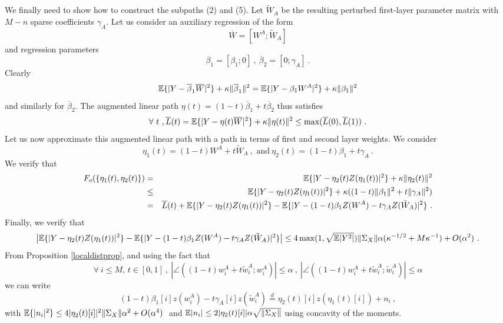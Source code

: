 We finally need to show how to construct the subpaths (2) and (5).
Let $\tilde{W}_A$ be the resulting perturbed first-layer parameter matrix 
with $M-n$ sparse coefficients $\gamma_A$.
Let us consider an auxiliary regression of the form 
$$\overline{W} = [ W^A ; \tilde{W}_A]$$
and regression parameters 
$$\overline{\beta}_1 = [ \beta_1; 0]~,~\overline{\beta}_2 = [0; \gamma_A]~.$$
Clearly 
$${\mathbb{E}}\{ | Y - \overline{\beta}_1 \overline{W} |^2 \} + \kappa \| \overline{\beta}_1 \|^2 = {\mathbb{E}}\{ | Y - \beta_1 W^A |^2 \} + \kappa \| {\beta}_1 \|^2 $$ 
and similarly for $\overline{\beta}_2$. The augmented linear path $\eta(t) =(1- t) \overline{\beta}_1 + t \overline{\beta}_2$ thus satisfies 
$$\forall~t~,\overline{L}(t) = {\mathbb{E}}\{ | Y - \eta(t) \overline{W} |^2 \} + \kappa \| \eta(t) \|^2 \leq \max(\overline{L}(0), \overline{L}(1))~. $$
Let us now approximate this augmented linear path with a path in terms of first and second layer weights. 
We consider
$$\eta_1(t) = (1-t) W^A + t \tilde{W}_A~,\text{ and}~\eta_2(t) = (1- t) {\beta}_1 + t \gamma_A~.$$
We verify that 
\begin{eqnarray}
\label{bub1}
F_{o}(\{ \eta_1(t), \eta_2(t) \}) &=& {\mathbb{E}} \{ | Y - \eta_2(t) Z(\eta_1(t) ) |^2 \} + \kappa \| \eta_2(t) \|^2  \nonumber \\ 
&\leq & {\mathbb{E}} \{ | Y - \eta_2(t) Z(\eta_1(t) ) |^2 \} + \kappa(  ( 1-t) \| {\beta}_1\|^2 + t \| \gamma_A \|^2 ) \nonumber \\
& = & \overline{L}(t) + {\mathbb{E}} \{ | Y - \eta_2(t) Z(\eta_1(t) ) |^2 \}  - {\mathbb{E}} \{ | Y - (1-t) \beta_1 Z(W^A) - t \gamma_A Z(\tilde{W}_A) |^2 \} ~.
\end{eqnarray}
Finally, we verify that
\begin{equation}
\label{bub2}
\left | {\mathbb{E}} \{ | Y - \eta_2(t) Z(\eta_1(t) ) |^2 \}  - {\mathbb{E}} \{ | Y - (1-t) \beta_1 Z(W^A) - t \gamma_A Z(\tilde{W}_A) |^2 \} \right| \leq 4 \max(1, \sqrt{{\mathbb{E}}|Y^2|}) \| \Sigma_X \| \alpha ( \kappa^{-1/2} + M \kappa^{-1}) + O(\alpha^2)~.
\end{equation}
From Proposition \ref{localdistprop}, and using the fact that 
$$\forall~i\leq M,\, t \in [0,1]~,~\left| \angle( (1-t)w^A_i + t \tilde{w}^A_i ; w^A_i) \right| \leq \alpha~,~ \left| \angle( (1-t)w^A_i + t \tilde{w}^A_i ; \tilde{w}^A_i) \right| \leq \alpha $$
we can write 
$$(1-t) \beta_1[i] z(w^A_i) - t \gamma_A[i] z(\tilde{w}^A_i) \stackrel{d}{=} \eta_2(t)[i] z(\eta_1(t)[i]) + n_i ~,$$
with ${\mathbb{E}}\{ |n_i |^2 \} \leq 4 |\eta_2(t)[i]|^2 \| \Sigma_X \| \alpha^2 + O(\alpha^4)~$ and ${\mathbb{E}} |n_i| \leq 2 |\eta_2(t)[i]| \alpha \sqrt{\| \Sigma_X\|}$ using concavity of the moments.
